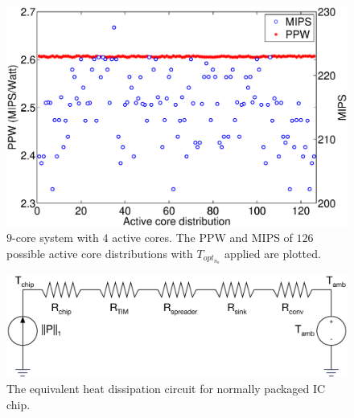 \begin{figure}
  \centering
  \includegraphics[width=0.9\columnwidth]{fig/mips_ppw.eps}
  \caption{$9$-core system with $4$ active cores. The PPW and MIPS of $126$ possible active core distributions with $T_{opt_{n_{a}}}$ applied are plotted.}
  \label{fig:mips_ppw}
\end{figure}
\begin{figure}
  \centering
  \includegraphics[width=0.8\columnwidth]{fig/resistor_line.eps}
  \caption{The equivalent heat dissipation circuit for normally
    packaged IC chip.}
  \label{fig:resistor_line}
\end{figure}



